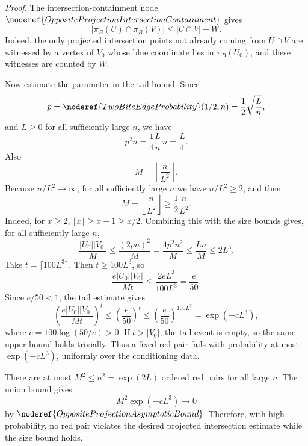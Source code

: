 \begin{proof}
The intersection-containment node
\(\noderef{OppositeProjectionIntersectionContainment}\) gives
\[
|\pi_B(U)\cap\pi_B(V)|
\le |U\cap V|+W.
\]
Indeed, the only projected intersection points not already coming from
\(U\cap V\) are witnessed by a vertex of \(V_0\) whose blue coordinate lies in
\(\pi_B(U_0)\), and these witnesses are counted by \(W\).

Now estimate the parameter in the tail bound.  Since
\[
p=\noderef{TwoBiteEdgeProbability}(1/2,n)
=\frac12\sqrt{\frac{L}{n}},
\]
and \(L\ge0\) for all sufficiently large \(n\), we have
\[
p^2n=\frac14\frac{L}{n}\,n=\frac{L}{4}.
\]
Also
\[
M=\left\lfloor\frac{n}{L^2}\right\rfloor .
\]
Because \(n/L^2\to\infty\), for all sufficiently large \(n\) we have
\(n/L^2\ge2\), and then
\[
M=\left\lfloor\frac{n}{L^2}\right\rfloor
\ge \frac12\frac{n}{L^2}.
\]
Indeed, for \(x\ge2\), \(\lfloor x\rfloor\ge x-1\ge x/2\).  Combining this
with the size bounds gives, for all sufficiently large \(n\),
\[
\frac{|U_0||V_0|}{M}
\le \frac{(2pn)^2}{M}
=\frac{4p^2n^2}{M}
\le \frac{Ln}{M}
\le 2L^3.
\]
Take \(t=\lceil100L^3\rceil\).  Then \(t\ge100L^3\), so
\[
\frac{e|U_0||V_0|}{Mt}
\le \frac{2eL^3}{100L^3}
=\frac e{50}.
\]
Since \(e/50<1\), the tail estimate gives
\[
\left(\frac{e|U_0||V_0|}{Mt}\right)^t
\le \left(\frac e{50}\right)^t
\le \left(\frac e{50}\right)^{100L^3}
=\exp(-cL^3),
\]
where \(c=100\log(50/e)>0\).  If \(t>|V_0|\), the tail event is empty, so the
same upper bound holds trivially.  Thus a fixed red pair fails with
probability at most \(\exp(-cL^3)\), uniformly over the conditioning data.

There are at most \(M^2\le n^2=\exp(2L)\) ordered red pairs for all large
\(n\).  The union bound gives
\[
M^2\exp(-cL^3)\to0
\]
by \(\noderef{OppositeProjectionAsymptoticBound}\).  Therefore, with high
probability, no red pair violates the desired projected intersection estimate
while the size bound holds.
\end{proof}
